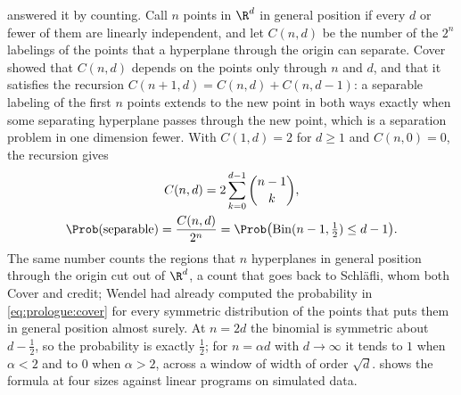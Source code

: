 \begin{refsection}
\textcite{Cover1965} answered it by counting. Call $n$ points in $\R^d$ in general position if every $d$ or fewer of them are linearly independent, and let $C(n,d)$ be the number of the $2^n$ labelings of the points that a hyperplane through the origin can separate. Cover showed that $C(n,d)$ depends on the points only through $n$ and $d$, and that it satisfies the recursion $C(n+1,d)=C(n,d)+C(n,d-1)$: a separable labeling of the first $n$ points extends to the new point in both ways exactly when some separating hyperplane passes through the new point, which is a separation problem in one dimension fewer. With $C(1,d)=2$ for $d\ge1$ and $C(n,0)=0$, the recursion gives
\begin{equation}\label{eq:prologue:cover}
\begin{gathered}
C(n,d)=2\sum_{k=0}^{d-1}\binom{n-1}{k},\\
\Prob(\text{separable})=\frac{C(n,d)}{2^n}=\Prob\bigl(\mathrm{Bin}(n-1,\tfrac12)\le d-1\bigr).
\end{gathered}
\end{equation}
The same number counts the regions that $n$ hyperplanes in general position through the origin cut out of $\R^d$, a count that goes back to Schläfli, whom both Cover and \textcite{Wendel1962} credit; Wendel had already computed the probability in \eqref{eq:prologue:cover} for every symmetric distribution of the points that puts them in general position almost surely. At $n=2d$ the binomial is symmetric about $d-\frac12$, so the probability is exactly $\frac12$; for $n=\alpha d$ with $d\to\infty$ it tends to $1$ when $\alpha<2$ and to $0$ when $\alpha>2$, across a window of width of order $\sqrt d$.  shows the formula at four sizes against linear programs on simulated data.


\end{refsection}
